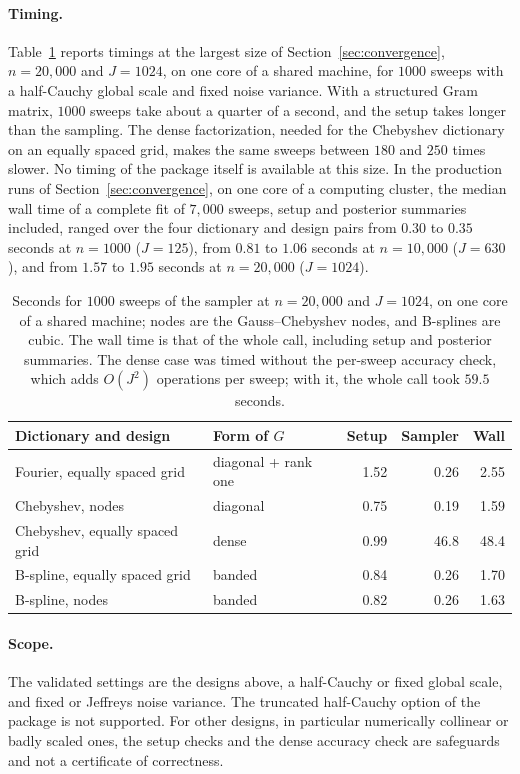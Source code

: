 \paragraph*{Timing.} Table~\ref{tab:timing} reports timings at the largest size of Section~\ref{sec:convergence}, $n=20{,}000$ and $J=1024$, on one core of a shared machine, for $1000$ sweeps with a half-Cauchy global scale and fixed noise variance. With a structured Gram matrix, $1000$ sweeps take about a quarter of a second, and the setup takes longer than the sampling. The dense factorization, needed for the Chebyshev dictionary on an equally spaced grid, makes the same sweeps between $180$ and $250$ times slower. No timing of the package itself is available at this size. In the production runs of Section~\ref{sec:convergence}, on one core of a computing cluster, the median wall time of a complete fit of $7{,}000$ sweeps, setup and posterior summaries included, ranged over the four dictionary and design pairs from $0.30$ to $0.35$ seconds at $n=1000$ ($J=125$), from $0.81$ to $1.06$ seconds at $n=10{,}000$ ($J=630$), and from $1.57$ to $1.95$ seconds at $n=20{,}000$ ($J=1024$).

\begin{table}[H]
\centering
\caption{Seconds for $1000$ sweeps of the sampler at $n=20{,}000$ and $J=1024$, on one core of a shared machine; nodes are the Gauss--Chebyshev nodes, and B-splines are cubic. The wall time is that of the whole call, including setup and posterior summaries. The dense case was timed without the per-sweep accuracy check, which adds $O(J^2)$ operations per sweep; with it, the whole call took $59.5$ seconds.}
\label{tab:timing}
\begin{tabular}{llrrr}
\toprule
Dictionary and design & Form of $G$ & Setup & Sampler & Wall \\
\midrule
Fourier, equally spaced grid & diagonal + rank one & 1.52 & 0.26 & 2.55 \\
Chebyshev, nodes & diagonal & 0.75 & 0.19 & 1.59 \\
Chebyshev, equally spaced grid & dense & 0.99 & 46.8 & 48.4 \\
B-spline, equally spaced grid & banded & 0.84 & 0.26 & 1.70 \\
B-spline, nodes & banded & 0.82 & 0.26 & 1.63 \\
\bottomrule
\end{tabular}
\end{table}

\paragraph*{Scope.} The validated settings are the designs above, a half-Cauchy or fixed global scale, and fixed or Jeffreys noise variance. The truncated half-Cauchy option of the package is not supported. For other designs, in particular numerically collinear or badly scaled ones, the setup checks and the dense accuracy check are safeguards and not a certificate of correctness.
